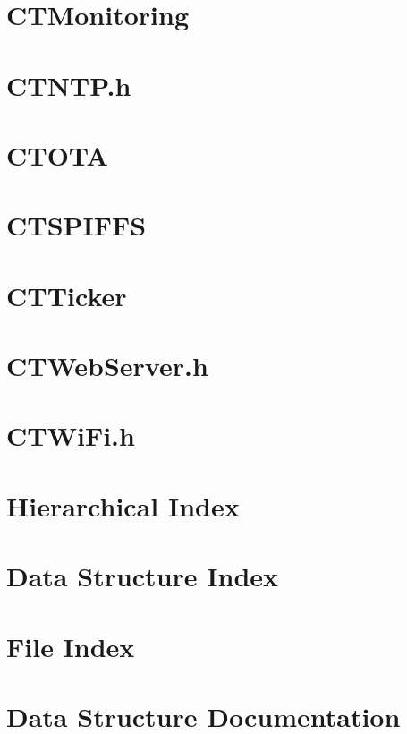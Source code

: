 \documentclass[twoside]{book}
\newcommand{\+}{\discretionary{\mbox{\scriptsize$\hookleftarrow$}}{}{}}
\begin{document}
\chapter{CTMonitoring}
\label{_c_t_monitoring}

\chapter{CTNTP.\+h}
\label{_c_t_n_t_p_8h}

\chapter{CTOTA}
\label{_c_t_o_t_a}

\chapter{CTSPIFFS}
\label{_c_t_s_p_i_f_f_s}

\chapter{CTTicker}
\label{_c_t_ticker}

\chapter{CTWeb\+Server.\+h}
\label{_c_t_web_server_8h}

\chapter{CTWi\+Fi.\+h}
\label{_c_t_wi_fi_8h}

\chapter{Hierarchical Index}

\chapter{Data Structure Index}

\chapter{File Index}

\chapter{Data Structure Documentation}

\end{document}
